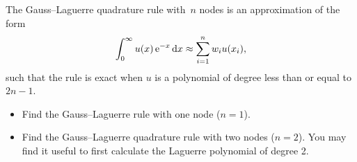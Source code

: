 \begin{exercise}
    The Gauss--Laguerre quadrature rule with~$n$ nodes is an approximation of the form
    \[
        \int_{0}^{\infty} u(x) \, \mathrm e^{-x} \, \mathrm d x \approx \sum_{i=1}^{n} w_i u(x_i),
    \]
    such that the rule is exact when $u$ is a polynomial of degree less than or equal to $2n-1$.
    \begin{itemize}
        \item 
            Find the Gauss--Laguerre rule with one node ($n = 1$).

        \item
            Find the Gauss--Laguerre quadrature rule with two nodes ($n = 2$).
            You may find it useful to first calculate the Laguerre polynomial of degree 2.
    \end{itemize}
\end{exercise}
